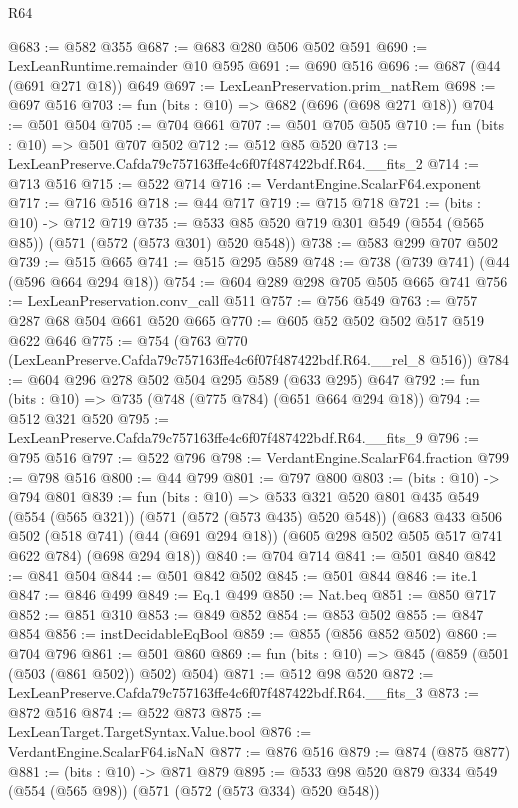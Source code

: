 \begin{lexlean}{R64}
\begin{coremodule}
@683 := @582 @355
@687 := @683 @280 @506 @502 @591
@690 := LexLeanRuntime.remainder @10 @595
@691 := @690 @516
@696 := @687 (@44 (@691 @271 @18)) @649
@697 := LexLeanPreservation.prim_natRem
@698 := @697 @516
@703 := fun (bits : @10) => @682 (@696 (@698 @271 @18))
@704 := @501 @504
@705 := @704 @661
@707 := @501 @705 @505
@710 := fun (bits : @10) => @501 @707 @502
@712 := @512 @85 @520
@713 := LexLeanPreserve.Cafda79c757163ffe4c6f07f487422bdf.R64.__fits_2
@714 := @713 @516
@715 := @522 @714
@716 := VerdantEngine.ScalarF64.exponent
@717 := @716 @516
@718 := @44 @717
@719 := @715 @718
@721 := (bits : @10) -> @712 @719
@735 := @533 @85 @520 @719 @301 @549 (@554 (@565 @85)) (@571 (@572 (@573 @301) @520 @548))
@738 := @583 @299 @707 @502
@739 := @515 @665
@741 := @515 @295 @589
@748 := @738 (@739 @741) (@44 (@596 @664 @294 @18))
@754 := @604 @289 @298 @705 @505 @665 @741
@756 := LexLeanPreservation.conv_call @511
@757 := @756 @549
@763 := @757 @287 @68 @504 @661 @520 @665
@770 := @605 @52 @502 @502 @517 @519 @622 @646
@775 := @754 (@763 @770 (LexLeanPreserve.Cafda79c757163ffe4c6f07f487422bdf.R64.__rel_8 @516))
@784 := @604 @296 @278 @502 @504 @295 @589 (@633 @295) @647
@792 := fun (bits : @10) => @735 (@748 (@775 @784) (@651 @664 @294 @18))
@794 := @512 @321 @520
@795 := LexLeanPreserve.Cafda79c757163ffe4c6f07f487422bdf.R64.__fits_9
@796 := @795 @516
@797 := @522 @796
@798 := VerdantEngine.ScalarF64.fraction
@799 := @798 @516
@800 := @44 @799
@801 := @797 @800
@803 := (bits : @10) -> @794 @801
@839 := fun (bits : @10) =>
  @533
    @321
    @520
    @801
    @435
    @549
    (@554 (@565 @321))
    (@571 (@572 (@573 @435) @520 @548))
    (@683
      @433
      @506
      @502
      (@518 @741)
      (@44 (@691 @294 @18))
      (@605 @298 @502 @505 @517 @741 @622 @784)
      (@698 @294 @18))
@840 := @704 @714
@841 := @501 @840
@842 := @841 @504
@844 := @501 @842 @502
@845 := @501 @844
@846 := ite.{1}
@847 := @846 @499
@849 := Eq.{1} @499
@850 := Nat.beq
@851 := @850 @717
@852 := @851 @310
@853 := @849 @852
@854 := @853 @502
@855 := @847 @854
@856 := instDecidableEqBool
@859 := @855 (@856 @852 @502)
@860 := @704 @796
@861 := @501 @860
@869 := fun (bits : @10) => @845 (@859 (@501 (@503 (@861 @502)) @502) @504)
@871 := @512 @98 @520
@872 := LexLeanPreserve.Cafda79c757163ffe4c6f07f487422bdf.R64.__fits_3
@873 := @872 @516
@874 := @522 @873
@875 := LexLeanTarget.TargetSyntax.Value.bool
@876 := VerdantEngine.ScalarF64.isNaN
@877 := @876 @516
@879 := @874 (@875 @877)
@881 := (bits : @10) -> @871 @879
@895 := @533 @98 @520 @879 @334 @549 (@554 (@565 @98)) (@571 (@572 (@573 @334) @520 @548))

\end{coremodule}
\end{lexlean}
